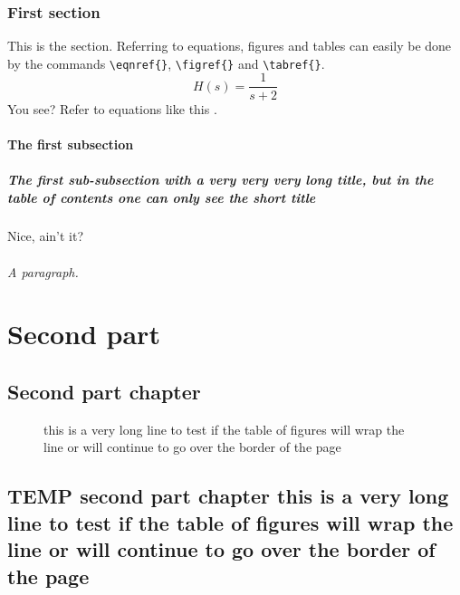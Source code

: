 \documentclass[a4paper,11pt]{mscThesis}
\begin{document}
        \section{First section}

        This is the section. Referring to equations, figures and tables can easily be done by the commands \verb"\eqnref{}",
        \verb"\figref{}" and \verb"\tabref{}".
        \begin{equation}\label{eq:First}
              H(s) = \frac{1}{s+2}
        \end{equation}
        You see? Refer to equations like this .
            \subsection{The first subsection}

                \subsubsection[Subsection Short Title]{The first sub-subsection with a very very very long title, but in the table of contents one can only see the short title}

                Nice, ain't it?

                    \paragraph{A paragraph.}
    \part{Second part}

    \chapter{Second part chapter}
   \begin{figure}
    \caption{this is a very long line to test if the table of
    figures will wrap the line or will continue to go over the
    border  of the page}
    \end{figure}

    \chapter{TEMP second part chapter this is a very long line to test if the table of
    figures will wrap the line or will continue to go over the
    border  of the page}
\end{document}
